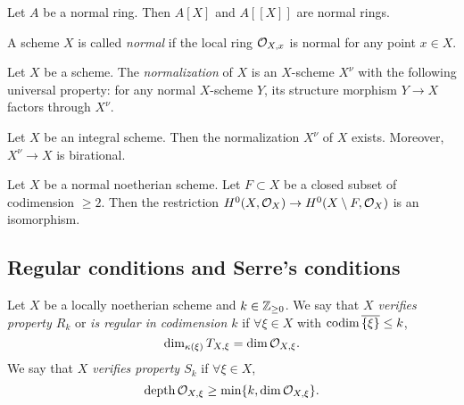     \begin{proposition}
        Let $A$ be a normal ring.
        Then $A[X]$ and $A[[X]]$ are normal rings.
    \end{proposition}

    \begin{definition}
        A scheme $X$ is called \textit{normal} if the local ring $\mathcal{O}_{X,x}$ is normal for any point $x\in X$.
    \end{definition}

    \begin{example}
        
    \end{example}

    \begin{definition}
        Let $X$ be a scheme.
        The \textit{normalization} of $X$ is an $X$-scheme $X^\nu$ with the following universal property:
        for any normal $X$-scheme $Y$, its structure morphism $Y \to X$ factors through $X^\nu$.
    \end{definition}

    \begin{proposition}
        Let $X$ be an integral scheme.
        Then the normalization $X^\nu$ of $X$ exists.
        Moreover, $X^\nu \to X$ is birational.
    \end{proposition}

    \begin{theorem}
        Let $X$ be a normal noetherian scheme.
        Let $F \subset X$ be a closed subset of codimension $\geq 2$.
        Then the restriction $H^0(X,\mathcal{O}_X) \to H^0(X\setminus F, \mathcal{O}_{X})$ is an isomorphism.
    \end{theorem}


    
\subsection{Regular conditions and Serre's conditions}

    \begin{definition}
        Let $X$ be a locally noetherian scheme and $k \in \mathbb{Z}_{\geq 0}$.
        We say that \textit{$X$ verifies property $R_k$} or \textit{is regular in codimension $k$} if $\forall \xi \in X$ with $\operatorname{codim} \overline{\{\xi\}} \leq k$, 
        \[ \dim_{\kappa(\xi)} T_{X,\xi} = \dim \mathcal{O}_{X,\xi}. \]
        We say that \textit{$X$ verifies property $S_k$} if $\forall \xi \in X$,
        \[ \operatorname{depth} \mathcal{O}_{X,\xi} \geq \min\{k, \dim \mathcal{O}_{X,\xi}\}. \]        
    \end{definition}

